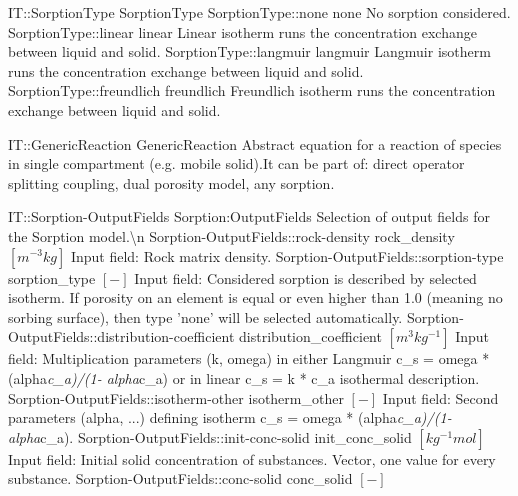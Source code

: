 \begin{SelectionType}
	{IT::SorptionType}
	{SorptionType}
	{}
		\SelectionItem
			{SorptionType::none}
			{none}
			{{{No sorption considered.}%
}}
		\SelectionItem
			{SorptionType::linear}
			{linear}
			{{{Linear isotherm runs the concentration exchange between liquid and solid.}%
}}
		\SelectionItem
			{SorptionType::langmuir}
			{langmuir}
			{{{Langmuir isotherm runs the concentration exchange between liquid and solid.}%
}}
		\SelectionItem
			{SorptionType::freundlich}
			{freundlich}
			{{{Freundlich isotherm runs the concentration exchange between liquid and solid.}%
}}
\end{SelectionType}
\begin{AbstractType}
	{IT::GenericReaction}
	{GenericReaction}
	{}
	{{{Abstract equation for a reaction of species in single compartment (e.g. mobile solid).It can be part of: direct operator splitting coupling, dual porosity model, any sorption.}%
}}
\end{AbstractType}
\begin{SelectionType}
	{IT::Sorption-OutputFields}
	{Sorption:OutputFields}
	{{{Selection of output fields for the Sorption model.{\textbackslash}n}%
}}
		\SelectionItem
			{Sorption-OutputFields::rock-density}
			{rock{\_}density}
			{{{}{$[m^{-3}kg]$}{ Input field: Rock matrix density.}%
}}
		\SelectionItem
			{Sorption-OutputFields::sorption-type}
			{sorption{\_}type}
			{{{}{$[-]$}{ Input field: Considered sorption is described by selected isotherm.
If porosity on an element is equal or even higher than 1.0 (meaning no sorbing surface), then type 'none' will be selected automatically.}%
}}
		\SelectionItem
			{Sorption-OutputFields::distribution-coefficient}
			{distribution{\_}coefficient}
			{{{}{$[m^{3}kg^{-1}]$}{ Input field: Multiplication parameters (k, omega) in either Langmuir c{\_}s = omega * (alpha}\textit{c{\_}a)/(1- alpha}{c{\_}a) or in linear c{\_}s = k * c{\_}a isothermal description.}%
}}
		\SelectionItem
			{Sorption-OutputFields::isotherm-other}
			{isotherm{\_}other}
			{{{}{$[-]$}{ Input field: Second parameters (alpha, ...) defining isotherm  c{\_}s = omega * (alpha}\textit{c{\_}a)/(1- alpha}{c{\_}a).}%
}}
		\SelectionItem
			{Sorption-OutputFields::init-conc-solid}
			{init{\_}conc{\_}solid}
			{{{}{$[kg^{-1}mol]$}{ Input field: Initial solid concentration of substances.
Vector, one value for every substance.}%
}}
		\SelectionItem
			{Sorption-OutputFields::conc-solid}
			{conc{\_}solid}
			{{{}{$[-]$}{ }%
}}
\end{SelectionType}

